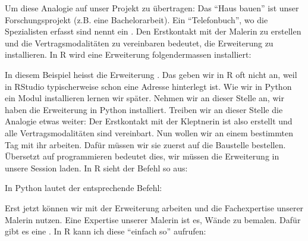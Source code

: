 \documentclass[letterpaper,10pt,english]{sphinxmanual}
\begin{document}
Um diese Analogie auf unser Projekt zu übertragen: Das “Haus bauen” ist unser Forschungsprojekt (z.B. eine Bachelorarbeit). Ein “Telefonbuch”, wo die Spezialisten erfasst sind nennt ein . Den Erstkontakt mit der Malerin zu erstellen und die Vertragsmodalitäten zu vereinbaren bedeutet, die Erweiterung zu installieren. In R wird eine Erweiterung folgendermassen installiert:

\begin{sphinxVerbatim}[commandchars=\\\{\}]
\end{sphinxVerbatim}

In diesem Beispiel heisst die Erweiterung . Das  geben wir in R oft nicht an, weil in RStudio typischerweise schon eine Adresse hinterlegt ist. Wie wir in Python ein Modul installieren lernen wir später. Nehmen wir an dieser Stelle an, wir haben die Erweiterung  in Python installiert. Treiben wir an dieser Stelle die Analogie etwas weiter: Der Erstkontakt mit der Kleptnerin ist also erstellt und alle Vertragsmodalitäten sind vereinbart. Nun wollen wir an einem bestimmten Tag mit ihr arbeiten. Dafür müssen wir sie zuerst auf die Baustelle bestellen. Übersetzt auf programmieren bedeutet dies, wir müssen die Erweiterung in unsere Session laden. In R sieht der Befehl so aus:

\begin{sphinxVerbatim}[commandchars=\\\{\}]
\end{sphinxVerbatim}

In Python lautet der entsprechende Befehl:

\begin{sphinxVerbatim}[commandchars=\\\{\}]
 
\end{sphinxVerbatim}

Erst jetzt können wir mit der Erweiterung arbeiten und die Fachexpertise unserer Malerin nutzen. Eine Expertise unserer Malerin ist es, Wände zu bemalen. Dafür gibt es eine  . In R kann ich diese  “einfach so” aufrufen:
\end{document}
